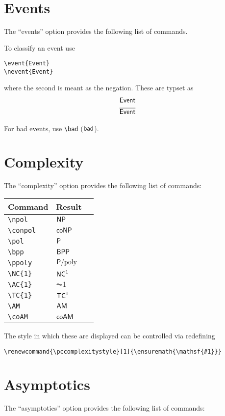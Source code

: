 \documentclass[a4paper]{report}
\begin{document}
\section{Events}
The \enquote{events} option provides the following list of commands.

To classify an event use
\begin{lstlisting}
\event{Event}
\nevent{Event}
\end{lstlisting}
where the second is meant as the negation. These are typset as
\begin{align*}
&\mathsf{Event}\\
&\overline{\mathsf{Event}}
\end{align*}

For bad events, use \lstinline$\bad$ ($\mathsf{bad}$).

\section{Complexity}
The \enquote{complexity} option provides the following list of commands:

\begin{center}
\begin{tabular}{l l l}
\textbf{Command} & \textbf{Result} \\\hline
\lstinline$\npol$ &  $\npol$  \\
\lstinline$\conpol$ &  $\conpol$  \\
\lstinline$\pol$ &  $\pol$  \\
\lstinline$\bpp$ & $\bpp$  \\
\lstinline$\ppoly$ & $\ppoly$  \\
\lstinline$\NC{1}$ &  $\NC1$  \\
\lstinline$\AC{1}$ & $\AC1$  \\
\lstinline$\TC{1}$ & $\TC1$ \\
\lstinline$\AM$ &  $\AM$  \\
\lstinline$\coAM$ &  $\coAM$
\end{tabular}
\end{center}

The style in which these are displayed can be controlled via redefining
\begin{lstlisting}
\renewcommand{\pccomplexitystyle}[1]{\ensuremath{\mathsf{#1}}}
\end{lstlisting}

\section{Asymptotics}
The \enquote{asymptotics} option provides the following list of commands:
\end{document}
